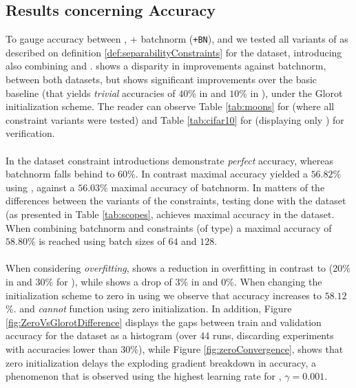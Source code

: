 \subsection{Results concerning Accuracy}\label{subsec:accuracyResults}
To gauge accuracy between \ReLU, \ReLU +  batchnorm (\texttt{\ReLU+BN}), and \SCReLU we tested all variants of \SCReLU as described on definition \ref{def:separabilityConstraints} for the \moons dataset, introducing also  \ReLUPU combining \ReLUU and \ReLUP. \SCReLU shows a disparity in improvements against batchnorm, between both datasets, but shows significant improvements over the basic \ReLU baseline (that yields \emph{trivial} accuracies of $40$\% in \moons and $10$\% in \cifar), under the Glorot initialization scheme. The reader can observe Table \ref{tab:moons} for \moons (where all \SCReLU constraint variants were tested) and Table \ref{tab:cifar10} for \cifar (displaying only \ReLUL) for verification. 
\\\\
In the \moons dataset constraint introductions demonstrate \emph{perfect} accuracy, whereas batchnorm falls behind to $60$\%.  In contrast maximal \cifar accuracy yielded a $56.82$\% using \ReLUL, against a $56.03$\% maximal accuracy of batchnorm. In matters of the differences between the variants of the constraints, testing done with the \moons dataset (as presented in Table \ref{tab:scopes}, \ReLUL achieves maximal accuracy in the \moons dataset.  When combining batchnorm and constraints (of \ReLUL type) a maximal accuracy of $58.80$\% is reached using batch sizes of $64$ and $128$.  
\\\\
When considering \emph{overfitting}, \ReLUL shows a reduction in overfitting in contrast to \ReLUBN (20\% in \moons and 30\% for \cifar), while \ReLUL shows a drop of $3\%$ in \cifar and $0$\%. When changing the initialization scheme to zero in \cifar using \ReLUL we observe that accuracy increases to $58.12$\%. \ReLUBN and \ReLU \emph{cannot} function using zero initialization. In addition, Figure \ref{fig:ZeroVsGlorotDifference} displays the gaps between train and validation accuracy for the \cifar dataset as a histogram (over 44 runs, discarding experiments with accuracies lower than $30$\%), while Figure \ref{fig:zeroConvergence}, shows that zero initialization delays the exploding gradient breakdown in accuracy, a phenomenon that is observed using the highest learning rate for \cifar, $\gamma=0.001$. 
